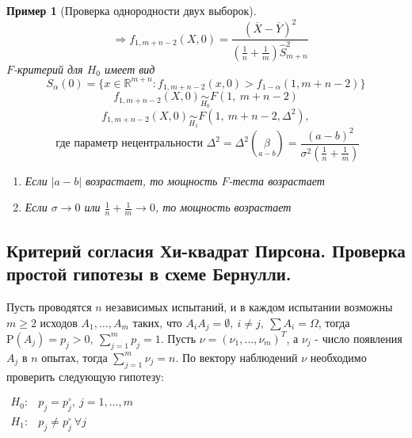 \documentclass[12pt]{article}
\newtheorem*{example}{Пример}
\theoremstyle{basic_theorem}
\theoremstyle{name_theorem}
\def\R{ \mathbb{R} }
\def\P{ \mathrm{P} }
\begin{document}
\begin{example}[Проверка однородности двух выборок]
\[\begin{array}{l}
\end{array}
\Rightarrow
\boxed{f_{1, m+n-2}(X,0)=\frac{(\overline{X}-\overline{Y})^2}{\left(\frac{1}{n} + \frac{1}{m}\right)\widehat{S}^2_{m+n}}}
\]
$F$-критерий для $H_0$ имеет вид
\[S_{\alpha}(0)=\{x\in\R^{m+n}:f_{1,m+n-2}(x,0)>f_{1-\alpha}(1,m+n-2)\}\]
\[f_{1,m+n-2}(X,0)\underset{H_0}{\sim}F(1,\ m+n-2)\]
\[f_{1,m+n-2}(X,0)\underset{H_1}{\sim}F(1,\ m+n-2,\Delta^2),\]
\[\text{ где параметр нецентральности } \Delta^2=\Delta^2(\underset{a-b}{\beta})=\frac{(a-b)^2}{\sigma^2\left(\frac{1}{n}+\frac{1}{m}\right)}\]
\begin{enumerate}
    \item Если $\vert a-b\vert$  возрастает, то мощность $F$-теста возрастает
    \item Если $\sigma\rightarrow0$ или $\frac{1}{n}+\frac{1}{m}\rightarrow0$, то мощность возрастает
\end{enumerate}
\end{example}
\subsection{Критерий согласия Хи-квадрат Пирсона. Проверка простой гипотезы в схеме Бернулли.}
Пусть проводятся $n$ независимых испытаний, и в каждом испытании возможны
$m\geq2$ исходов $A_1,\ldots,A_m$ таких, что $A_iA_j=\emptyset,\ i\neq j,\ \sum A_i=\Omega$, тогда
$\P(A_j)=p_j>0,\ \sum_{j=1}^mp_j=1$. Пусть $\nu=(\nu_1,\ldots,\nu_m)^T$, а $\nu_j$ -
число появления $A_j$ в $n$ опытах, тогда $\sum_{j=1}^m\nu_j=n$.
По вектору наблюдений $\nu$ необходимо проверить следующую гипотезу:

$\begin{array}{cl}
    H_0:& p_j=p_j^\circ,\ j=1,\ldots,m\\
    H_1:& p_j\neq p_j^\circ\ \forall j
\end{array}$
\end{document}
